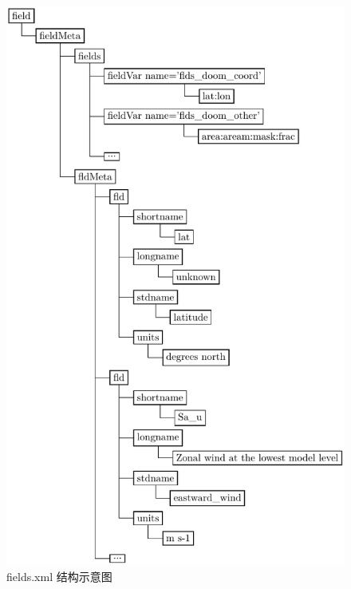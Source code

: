\begin{figure}[h]
\begin{minipage}[t]{0.5\linewidth}
\centering
\includegraphics[height=.5\textheight]{../figures/fields.pdf}
\caption{fields.xml 结构示意图}
\end{minipage}
\begin{minipage}[t]{0.5\linewidth}
\centering

\end{minipage}
\end{figure}
